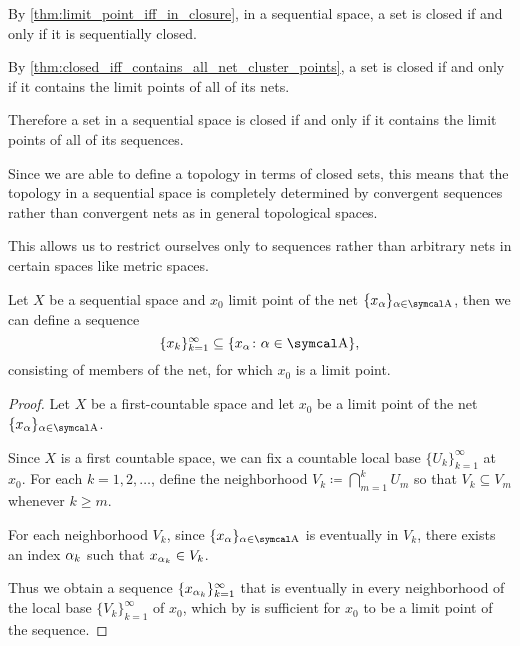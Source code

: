 \begin{remark}\label{remark:sequential_spaces}
  By \cref{thm:limit_point_iff_in_closure}, in a sequential space, a set is closed if and only if it is sequentially closed.

  By \cref{thm:closed_iff_contains_all_net_cluster_points}, a set is closed if and only if it contains the limit points of all of its nets.

  Therefore a set in a sequential space is closed if and only if it contains the limit points of all of its sequences.

  Since we are able to define a topology in terms of closed sets, this means that the topology in a sequential space is completely determined by convergent sequences rather than convergent nets as in general topological spaces.

  This allows us to restrict ourselves only to sequences rather than arbitrary nets in certain spaces like metric spaces.
\end{remark}

\begin{lemma}\label{thm:sequential_space_convergence}
  Let \( X \) be a sequential space and \( x_0 \) limit point of the net \( \{ x_\al \}_{\al \in \CA} \), then we can define a sequence
  \begin{equation*}
    \{ x_k \}_{k=1}^\infty \subseteq \{ x_\al \colon \al \in \CA \},
  \end{equation*}
  consisting of members of the net, for which \( x_0 \) is a limit point.
\end{lemma}
\begin{proof}
  Let \( X \) be a first-countable space and let \( x_0 \) be a limit point of the net \( \{ x_\al \}_{\al \in \CA} \).

  Since \( X \) is a first countable space, we can fix a countable local base \( \{ U_k \}_{k=1}^\infty \) at \( x_0 \). For each \( k = 1, 2, \ldots \), define the neighborhood \( V_k \coloneqq \bigcap_{m=1}^k U_m \) so that \( V_k \subseteq V_m \) whenever \( k \geq m \).

  For each neighborhood \( V_k \), since \( \{ x_\al \}_{\al \in \CA} \) is eventually in \( V_k \), there exists an index \( \alpha_k \) such that \( x_{\alpha_k} \in V_k \).

  Thus we obtain a sequence \( \{ x_{\alpha_k} \}_{k=1}^\infty \) that is eventually in every neighborhood of the local base \( \{ V_k \}_{k=1}^\infty \) of \( x_0 \), which by  is sufficient for \( x_0 \) to be a limit point of the sequence.
\end{proof}

